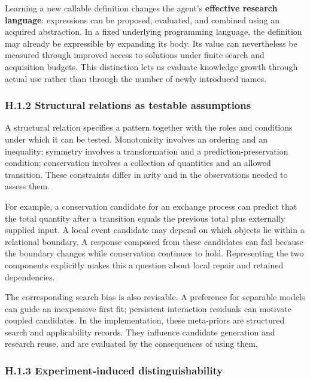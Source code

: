 \documentclass[11pt,a4paper]{article}
\begin{document}
Learning a new callable definition changes the agent's \textbf{effective research language}: expressions can be proposed, evaluated, and combined using an acquired abstraction. In a fixed underlying programming language, the definition may already be expressible by expanding its body. Its value can nevertheless be measured through improved access to solutions under finite search and acquisition budgets. This distinction lets us evaluate knowledge growth through actual use rather than through the number of newly introduced names.


\subsubsection*{H.1.2 Structural relations as testable assumptions}

A structural relation specifies a pattern together with the roles and conditions under which it can be tested. Monotonicity involves an ordering and an inequality; symmetry involves a transformation and a prediction-preservation condition; conservation involves a collection of quantities and an allowed transition. These constraints differ in arity and in the observations needed to assess them.


For example, a conservation candidate for an exchange process can predict that the total quantity after a transition equals the previous total plus externally supplied input. A local event candidate may depend on which objects lie within a relational boundary. A response composed from these candidates can fail because the boundary changes while conservation continues to hold. Representing the two components explicitly makes this a question about local repair and retained dependencies.


The corresponding search bias is also revisable. A preference for separable models can guide an inexpensive first fit; persistent interaction residuals can motivate coupled candidates. In the implementation, these meta-priors are structured search and applicability records. They influence candidate generation and research reuse, and are evaluated by the consequences of using them.


\subsubsection*{H.1.3 Experiment-induced distinguishability}
\end{document}
